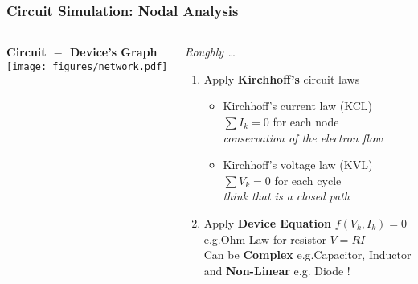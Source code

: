 
\begin{frame}
  \frametitle{Circuit Simulation: Nodal Analysis}
  \begin{columns}
    \begin{column}{.5\textwidth}
      \begin{center}
        \textbf{Circuit $\equiv$ Device's Graph} \\[1em]
        \texttt{[image: figures/network.pdf]}
      \end{center}
    \end{column}
    \begin{column}{.5\textwidth}
      \textit{Roughly \ldots} \\[1em]
      \begin{enumerate}
      \item Apply \textbf{Kirchhoff's} circuit laws
        \begin{itemize}
        \item Kirchhoff's current law (KCL) \\
          $\sum {I}_k = 0$ for each node \\
          \textit{conservation of the electron flow} \\[.5em]
        \item Kirchhoff's voltage law (KVL) \\
          $\sum {V}_k = 0$ for each cycle \\
          \textit{think that is a closed path} \\[1em]
        \end{itemize}
      \item Apply \textbf{Device Equation} $f(V_k,I_k) = 0$ \\
        e.g.\@ Ohm Law for resistor $V = R I$ \\[.5em]
        Can be \textbf{Complex} e.g.\@ Capacitor, Inductor \\
        and \textbf{Non-Linear} e.g. Diode !
      \end{enumerate}
    \end{column}
  \end{columns}
\end{frame}

